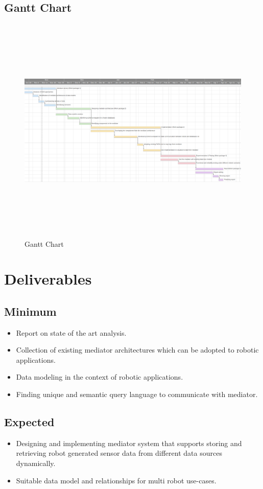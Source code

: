 \documentclass[12pt]{article}
\begin{document}
\begin{landscape}
	\subsection{Gantt Chart}
	\begin{figure}[h!]
	  \includegraphics[width=20cm,height=11cm]{time_line_v1.png}
	  \caption{Gantt Chart}
	  \label{fig:gantt_chart}
	\end{figure}
\end{landscape}

\newpage
\section{Deliverables}
\subsection{Minimum}
\begin{itemize}
\item Report on state of the art analysis.
\item Collection of existing mediator architectures which can be adopted to robotic applications.
\item Data modeling in the context of robotic applications.
\item Finding unique and semantic query language to communicate with mediator.
\end{itemize}
\subsection{Expected}
\begin{itemize}
\item Designing and implementing mediator system that supports storing and retrieving robot generated sensor data from different data sources dynamically.
\item Suitable data model and relationships for multi robot use-cases.
\end{itemize}
\end{document}

